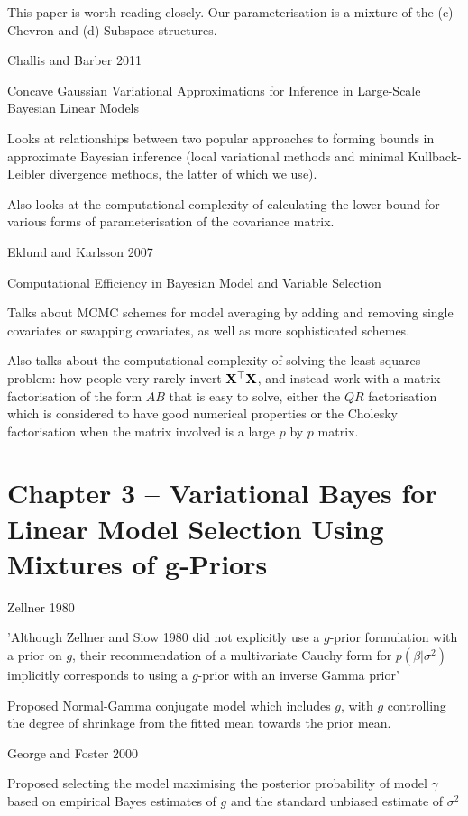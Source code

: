 \documentclass{amsart}[12pt]
\begin{document}
This paper is worth reading closely. Our parameterisation is a mixture of the (c) Chevron and (d) Subspace
structures.

Challis and Barber 2011

Concave Gaussian Variational Approximations for Inference in Large-Scale Bayesian Linear Models

Looks at relationships between two popular approaches to forming bounds in approximate Bayesian inference
(local variational methods and minimal Kullback-Leibler divergence methods, the latter of which we use).

Also looks at the computational complexity of calculating the lower bound for various forms of
parameterisation of the covariance matrix.

Eklund and Karlsson 2007

Computational Efficiency in Bayesian Model and Variable Selection

Talks about MCMC schemes for model averaging by adding and removing single covariates or swapping covariates,
as well as more sophisticated schemes.

Also talks about the computational complexity of solving the least squares problem: how people very rarely
invert ${\bf X}^\top {\bf X}$, and instead work with a matrix factorisation of the form $A B$ that is easy to solve,
either the $QR$ factorisation which is considered to have good numerical properties or the Cholesky
factorisation when the matrix involved is a large $p$ by $p$ matrix.

\section{Chapter 3 -- Variational Bayes for Linear Model Selection Using Mixtures of g-Priors}

Zellner 1980

'Although Zellner and Siow 1980 did not explicitly use a $g$-prior formulation with a prior on $g$,
their recommendation of a multivariate Cauchy form for $p(\beta|\sigma^2)$ implicitly corresponds to using a
$g$-prior with an inverse Gamma prior'

Proposed Normal-Gamma conjugate model which includes $g$, with $g$ controlling the degree of shrinkage
from the fitted mean towards the prior mean.

George and Foster 2000

Proposed selecting the model maximising the posterior probability of model $\gamma$ based on empirical
Bayes estimates of $g$ and the standard unbiased estimate of $\sigma^2$
\end{document}
